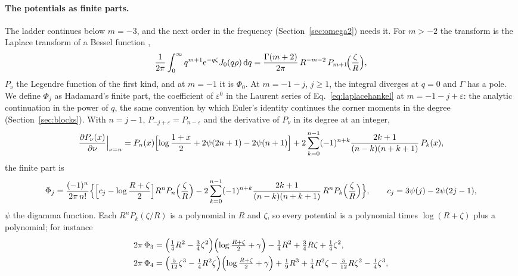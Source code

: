 \documentclass[11pt,a4paper]{article}
\newcommand{\dd}{\mathrm{d}}
\newcommand{\ee}{\mathrm{e}}
\begin{document}
\paragraph{The potentials as finite parts.} The ladder continues below $m=-3$, and the next order in the
frequency (Section~\ref{sec:omega2}) needs it. For $m>-2$ the transform is the Laplace transform of a Bessel
function \citep{GradshteynRyzhik2007},
\begin{equation}\label{eq:laplacehankel}
  \frac{1}{2\pi}\int_0^\infty q^{m+1}\ee^{-q\zeta}J_0(q\rho)\,\dd q
  =\frac{\Gamma(m+2)}{2\pi}\,R^{-m-2}\,P_{m+1}\!\Bigl(\frac{\zeta}{R}\Bigr),
\end{equation}
$P_\nu$ the Legendre function of the first kind, and at $m=-1$ it is $\Phi_0$. At $m=-1-j$, $j\ge1$, the
integral diverges at $q=0$ and $\Gamma$ has a pole. We define $\Phi_j$ as Hadamard's finite part, the
coefficient of $\varepsilon^0$ in the Laurent series of Eq.~\eqref{eq:laplacehankel} at $m=-1-j+\varepsilon$:
the analytic continuation in the power of $q$, the same convention by which Euler's identity continues the
corner moments in the degree (Section~\ref{sec:blocks}). With $n=j-1$, $P_{-j+\varepsilon}=P_{n-\varepsilon}$
and the derivative of $P_\nu$ in its degree at an integer,
\begin{equation}\label{eq:legendredegree}
  \frac{\partial P_\nu(x)}{\partial\nu}\Big|_{\nu=n}
  =P_n(x)\Bigl[\log\frac{1+x}{2}+2\psi(2n+1)-2\psi(n+1)\Bigr]
  +2\sum_{k=0}^{n-1}(-1)^{n+k}\frac{2k+1}{(n-k)(n+k+1)}\,P_k(x),
\end{equation}
the finite part is
\begin{equation}\label{eq:fppotentials}
  \Phi_j=\frac{(-1)^n}{2\pi\,n!}\Bigl\{\Bigl[c_j-\log\frac{R+\zeta}{2}\Bigr]R^nP_n\Bigl(\frac{\zeta}{R}\Bigr)
  -2\sum_{k=0}^{n-1}(-1)^{n+k}\frac{2k+1}{(n-k)(n+k+1)}\,R^nP_k\Bigl(\frac{\zeta}{R}\Bigr)\Bigr\},
  \qquad c_j=3\psi(j)-2\psi(2j-1),
\end{equation}
$\psi$ the digamma function. Each $R^nP_k(\zeta/R)$ is a polynomial in $R$ and $\zeta$, so every potential is
a polynomial times $\log(R+\zeta)$ plus a polynomial; for instance
\begin{equation}\label{eq:phi34}
\begin{aligned}
  2\pi\,\Phi_3&=\Bigl(\tfrac14R^2-\tfrac34\zeta^2\Bigr)\Bigl(\log\tfrac{R+\zeta}{2}+\gamma\Bigr)
  -\tfrac14R^2+\tfrac34R\zeta+\tfrac14\zeta^2,\\
  2\pi\,\Phi_4&=\Bigl(\tfrac{5}{12}\zeta^3-\tfrac14R^2\zeta\Bigr)\Bigl(\log\tfrac{R+\zeta}{2}+\gamma\Bigr)
  +\tfrac19R^3+\tfrac14R^2\zeta-\tfrac{5}{12}R\zeta^2-\tfrac14\zeta^3,
\end{aligned}
\end{equation}
\end{document}
